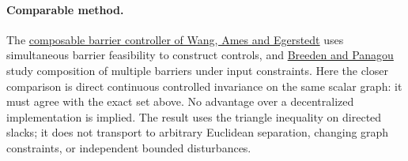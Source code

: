\documentclass[11pt]{article}
\begin{document}
\paragraph{Comparable method.}
The \href{https://liwanggt.github.io/files/B5_Composable_Barrier.pdf}{composable barrier controller of Wang, Ames and Egerstedt} uses simultaneous barrier feasibility to construct controls, and \href{https://public.websites.umich.edu/~dpanagou/assets/documents/JBreeden_ACC23.pdf}{Breeden and Panagou} study composition of multiple barriers under input constraints. Here the closer comparison is direct continuous controlled invariance on the same scalar graph: it must agree with the exact set above. No advantage over a decentralized implementation is implied. The result uses the triangle inequality on directed slacks; it does not transport to arbitrary Euclidean separation, changing graph constraints, or independent bounded disturbances.
\end{document}
